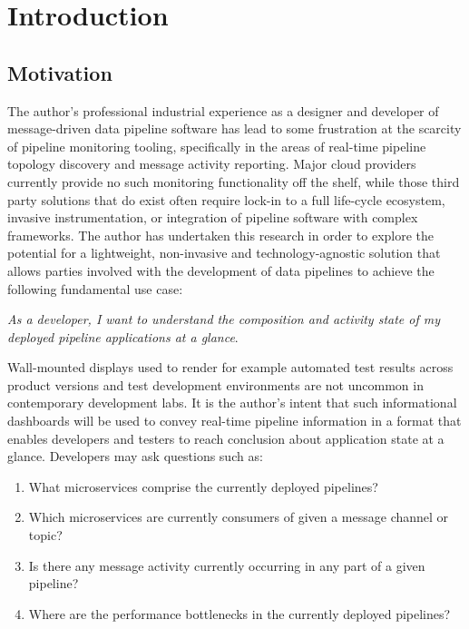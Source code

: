 \chapter{Introduction}

\section{Motivation}\label{intro_motivation}
The author's professional industrial experience as a designer and developer of message-driven data pipeline software has lead to some frustration at the scarcity of pipeline monitoring tooling, specifically in the areas of real-time pipeline topology discovery and message activity reporting. Major cloud providers currently provide no such monitoring functionality off the shelf, while those third party solutions that do exist often require  lock-in to a full life-cycle ecosystem, invasive instrumentation, or integration of pipeline software with complex frameworks. The author has undertaken this research in order to explore the potential for a lightweight, non-invasive and technology-agnostic solution that allows parties involved with the development of data pipelines to achieve the following fundamental use case:

\textit {As a developer, I want to understand the composition and activity state of my deployed pipeline applications at a glance}.

Wall-mounted displays used to render for example automated test results across product versions and test development environments are not uncommon in contemporary development labs. It is the author's intent that such informational dashboards will be used to convey real-time pipeline information in a format that enables developers and testers to reach conclusion about application state at a glance. Developers may ask questions such as:

\begin{enumerate}
	\item What microservices comprise the currently deployed pipelines?
	\item Which microservices are currently consumers of given a message channel or topic?
	\item Is there any message activity currently occurring in any part of a given pipeline?
	\item Where are the performance bottlenecks in the currently deployed pipelines?
\end{enumerate}

